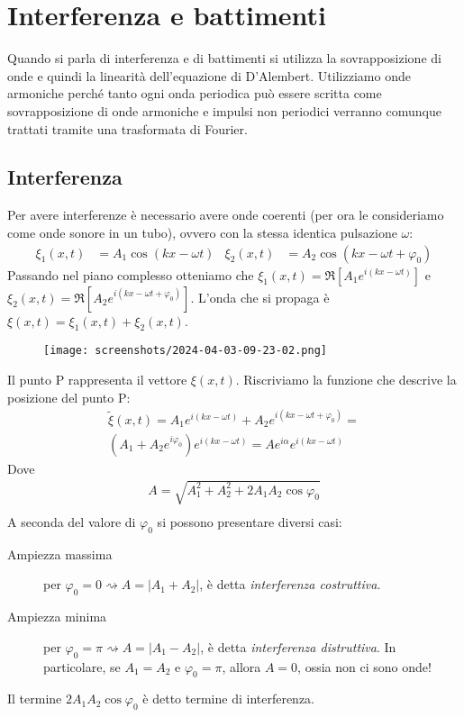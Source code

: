 \section{Interferenza e battimenti}

Quando si parla di interferenza e di battimenti si utilizza la sovrapposizione di onde e quindi la linearità dell'equazione di D'Alembert. Utilizziamo onde armoniche perché tanto ogni onda periodica può essere scritta come sovrapposizione di onde armoniche e impulsi non periodici verranno comunque trattati tramite una trasformata di Fourier.

\subsection{Interferenza}
Per avere interferenze è necessario avere onde coerenti (per ora le consideriamo come onde sonore in un tubo), ovvero con la stessa identica pulsazione \(\omega \):
\begin{align}
	\xi _1 (x,t) &= A_1 \cos (kx - \omega t) & \xi _2 (x,t) &= A_2 \cos (kx - \omega t + \varphi_0 )
\end{align}
Passando nel piano complesso otteniamo che \(\xi _1 (x,t) = \Re [A_1 e^{i(kx- \omega t)}]\) e \(\xi _2 (x,t) = \Re [A_2 e^{i(kx- \omega t + \varphi _0)}]\). L'onda che si propaga è \(\xi (x,t)= \xi _1(x,t) + \xi _2 (x,t)\).
\begin{figure}[H]
	\centering
	\texttt{[image: screenshots/2024-04-03-09-23-02.png]}
\end{figure}
Il punto P rappresenta il vettore \(\xi (x,t)\). Riscriviamo la funzione che descrive la posizione del punto P:
\begin{gather}
	\widetilde{\xi } (x,t) = A_1 e^{i(kx - \omega t)} + A_2 e^{i(kx - \omega t + \varphi _0)} =\\
	(A_1 + A_2 e^{i \varphi _0}) e^{i(kx - \omega t)} = A e^{i \alpha } e^{i(kx - \omega t)}
\end{gather}
Dove
\begin{gather}
	A  = \sqrt{A_1^2 + A_2^2 + 2A_1 A_2 \cos \varphi _0 }\\ 
\end{gather}
A seconda del valore di \(\varphi _0\) si possono presentare diversi casi:
\begin{description}
	\item[Ampiezza massima] per \(\varphi _0 = 0 \rightsquigarrow A = \vert A_1 + A_2 \vert \), è detta \emph{interferenza costruttiva}.
	\item[Ampiezza minima] per \(\varphi _0 = \pi \rightsquigarrow A = \vert A_1 - A_2 \vert \), è detta \emph{interferenza distruttiva}. In particolare, se \(A_1 = A_2\) e \(\varphi _0 = \pi \), allora \(A = 0\), ossia non ci sono onde!
\end{description}
Il termine \(2 A_1 A_2 \cos \varphi _0\) è detto termine di interferenza.
